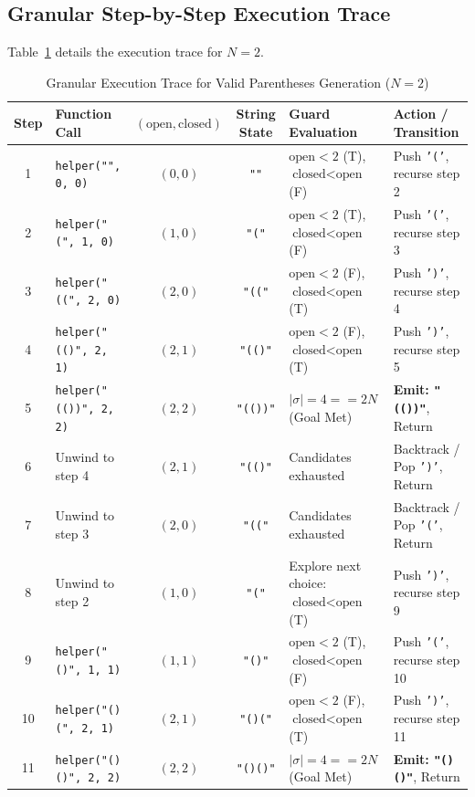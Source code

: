 \documentclass[10pt,journal,compsoc,onecolumn]{IEEEtran}
\begin{document}
\subsection{Granular Step-by-Step Execution Trace}
Table~\ref{tab:parentheses_trace} details the execution trace for $N = 2$.

\begin{table}[htbp]
\centering
\caption{Granular Execution Trace for Valid Parentheses Generation ($N=2$)}
\label{tab:parentheses_trace}
\begin{tabular}{clccll}
\toprule
Step & Function Call & $(\text{open}, \text{closed})$ & String State & Guard Evaluation & Action / Transition \\
\midrule
1 & \texttt{helper("", 0, 0)} & $(0, 0)$ & \texttt{""} & $\text{open} < 2$ (T), $\text{closed} < \text{open}$ (F) & Push \texttt{'('}, recurse step 2 \\
2 & \texttt{helper("(", 1, 0)} & $(1, 0)$ & \texttt{"("} & $\text{open} < 2$ (T), $\text{closed} < \text{open}$ (F) & Push \texttt{'('}, recurse step 3 \\
3 & \texttt{helper("((", 2, 0)} & $(2, 0)$ & \texttt{"(("} & $\text{open} < 2$ (F), $\text{closed} < \text{open}$ (T) & Push \texttt{')'}, recurse step 4 \\
4 & \texttt{helper("(()", 2, 1)} & $(2, 1)$ & \texttt{"(()"} & $\text{open} < 2$ (F), $\text{closed} < \text{open}$ (T) & Push \texttt{')'}, recurse step 5 \\
5 & \texttt{helper("(())", 2, 2)} & $(2, 2)$ & \texttt{"(())"} & $|\sigma| = 4 == 2N$ (Goal Met) & \textbf{Emit: \texttt{"(())"}}, Return \\
6 & Unwind to step 4 & $(2, 1)$ & \texttt{"(()"} & Candidates exhausted & Backtrack / Pop \texttt{')'}, Return \\
7 & Unwind to step 3 & $(2, 0)$ & \texttt{"(("} & Candidates exhausted & Backtrack / Pop \texttt{'('}, Return \\
8 & Unwind to step 2 & $(1, 0)$ & \texttt{"("} & Explore next choice: $\text{closed} < \text{open}$ (T) & Push \texttt{')'}, recurse step 9 \\
9 & \texttt{helper("()", 1, 1)} & $(1, 1)$ & \texttt{"()"} & $\text{open} < 2$ (T), $\text{closed} < \text{open}$ (F) & Push \texttt{'('}, recurse step 10 \\
10 & \texttt{helper("()(", 2, 1)} & $(2, 1)$ & \texttt{"()("} & $\text{open} < 2$ (F), $\text{closed} < \text{open}$ (T) & Push \texttt{')'}, recurse step 11 \\
11 & \texttt{helper("()()", 2, 2)} & $(2, 2)$ & \texttt{"()()"} & $|\sigma| = 4 == 2N$ (Goal Met) & \textbf{Emit: \texttt{"()()"}}, Return \\

\end{tabular}
\end{table}
\end{document}
